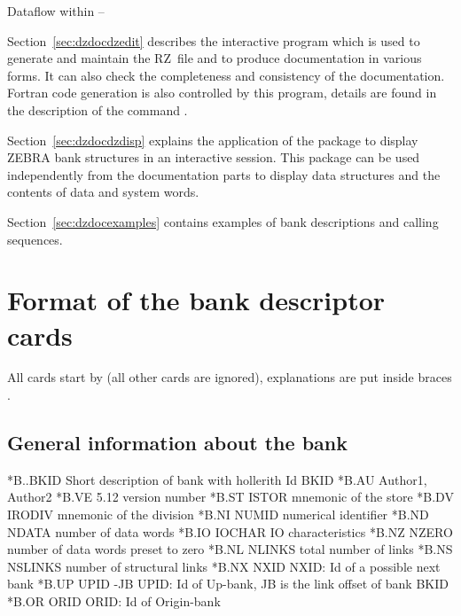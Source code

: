 \begin{Fighere}
  \begin{center}
     \mbox{}
    \caption{Dataflow within \protect{} -- \protect{}}
    \label{fig:DZDOCFIG1}
  \end{center}
\end{Fighere}
 
Section~\ref{sec:dzdocdzedit} 
describes the interactive program  which is used to
generate and maintain the RZ~file and to produce documentation in
various forms. 
It can also check the completeness and consistency of the documentation.
Fortran code generation is also controlled by this program, details
are found in the description of the command .
 
Section~\ref{sec:dzdocdzdisp} 
explains the application of the package to display ZEBRA bank
structures in an interactive session.
This package can be used independently from the documentation parts 
to display data structures and the contents of data and system words.
 
Section~\ref{sec:dzdocexamples} 
contains examples of bank descriptions and calling sequences.
 
\section{Format of the bank descriptor cards}
\label{sec:dzdocformat}
 
\begin{Note}
All cards start by  (all other cards are ignored), explanations
are put inside braces \Lit{\lcb\ \rcb}.
\end{Note}
 
\subsection{General information about the bank}
\label{sec:dzdocgeneral}
 
\begin{XMP}
*B..BKID  Short description of bank with hollerith Id BKID
*B.AU     Author1, Author2
*B.VE     5.12         \lcb version number\rcb 
*B.ST     ISTOR        \lcb mnemonic of the store\rcb 
*B.DV     IRODIV       \lcb mnemonic of the division\rcb 
*B.NI     NUMID        \lcb numerical identifier\rcb 
*B.ND     NDATA        \lcb number of data words\rcb 
*B.IO     IOCHAR       \lcb IO characteristics\rcb 
*B.NZ     NZERO        \lcb number of data words preset to zero\rcb 
*B.NL     NLINKS       \lcb total number of links\rcb 
*B.NS     NSLINKS      \lcb number of structural links\rcb 
*B.NX     NXID         \lcb NXID: Id of a possible next bank\rcb 
*B.UP     UPID  -JB    \lcb UPID: Id of Up-bank,
                        JB is the link offset of bank BKID\rcb 
*B.OR     ORID         \lcb ORID: Id of Origin-bank\rcb 
\end{XMP}
 

